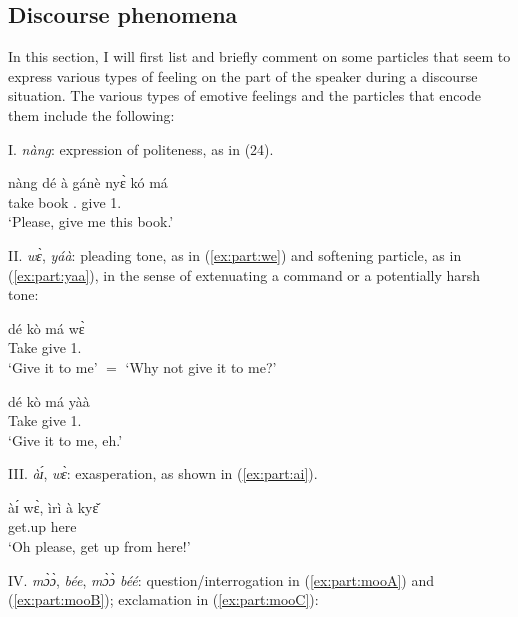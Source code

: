 \begin{refsection}
\subsection{ Discourse phenomena}
In this section, I will first list and briefly comment on some particles that seem to
express various types of feeling on the part of the speaker during a discourse situation. The
various types of emotive feelings and the particles that encode them include the following:\bigskip



\noindent I. \textit{nàng}: expression of politeness, as in (24).

\ea \label{ex:nang}\gll  nàng dé à gánè nyɛ̀ kó má\\
{\PART} take {\DEF} book {\DEM}. give 1.{\SG}\\
\glt ‘Please, give me this book.’\z


\noindent II. \textit{wɛ̀}, \textit{yáà}: pleading tone, as in (\ref{ex:part:we}) and softening particle, as in (\ref{ex:part:yaa}), in the sense of
extenuating a command or a potentially harsh tone:

\ea \label{ex:part:we}\gll  dé kò má wɛ̀\\
Take give 1.{\SG} {\PART}\\
\glt ‘Give it to me' $=$ `Why not give it to me?’\z

\ea  \label{ex:part:yaa} \gll  dé kò má yàà\\
Take give 1.{\SG} {\PART}\\
\glt ‘Give it to me, eh.’\z 


\noindent III. \textit{àɪ́}, \textit{wɛ̀}: exasperation, as shown in (\ref{ex:part:ai}).


\ea \label{ex:part:ai} \gll  àɪ́ wɛ̀, ìrì à kyɛ̌\\
{\PART} {\PART} get.up {\DEF} here\\
\glt ‘Oh please, get up from here!’\z 

\noindent IV. \textit{mɔ̀ɔ̀}, \textit{bée}, \textit{mɔ̀ɔ̀ béé}: question/interrogation in (\ref{ex:part:mooA}) and (\ref{ex:part:mooB}); exclamation in (\ref{ex:part:mooC}):


\ea {}
\z\z 


\end{refsection}
